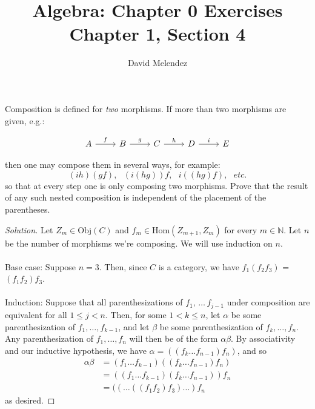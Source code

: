 \documentclass[12pt]{article}
\newenvironment{problem}[2][Problem]{\begin{trivlist}
\item[\hskip \labelsep {\bfseries #1}\hskip \labelsep {\bfseries #2.}]}{\end{trivlist}}
\newenvironment{solution}
  {\renewcommand\qedsymbol{$\blacksquare$}\begin{proof}[Solution]}
{\end{proof}}
\begin{document}
\title{Algebra: Chapter 0 Exercises\\ \large Chapter 1, Section 4}
\author{David Melendez}
\maketitle

\begin{problem}{4.1}
    Composition is defined for \textit{two} morphisms. 
    If more than two morphisms are given, e.g.:

    \[\begin{tikzcd}
        A \ar[r,"f"] & B \ar[r,"g"] & C \ar[r,"h"] & D \ar[r,"i"] & E
    \end{tikzcd}\]

    then one may compose them in several ways, for example:
    \begin{equation*}
        (ih)(gf),\,\,\,\, (i(hg))f,\,\,\,\, i((hg)f),\,\,\,\, etc.
    \end{equation*}
    so that at every step one is only composing two morphisms. 
    Prove that the result of any such nested composition is independent of the placement of the parentheses.
\end{problem}
\begin{solution}
  Let $Z_m \in \text{Obj}(C)$ and $f_m \in \text{Hom}{(Z_{m+1}, Z_{m})}$ for every $m \in \mathbb{N}$. 
  Let $n$ be the number of morphisms we're composing.
  We will use induction on $n$.
  \\\\Base case: Suppose $n=3$. 
  Then, since $C$ is a category, we have $f_1(f_2f_3)$ = $(f_1f_2)f_3$.
  \\\\Induction: Suppose that all parenthesizations of $f_1,\, \ldots\, f_{j-1}$ under composition are equivalent for all $1 \leq j < n$.
  Then, for some $1 < k \leq n$, let $\alpha$ be some parenthesization of $f_1, \ldots, f_{k-1}$, and let $\beta$ be some parenthesization of $f_k, \ldots, f_{n}$.
  Any parenthesization of $f_1, \ldots, f_n$ will then be of the form $\alpha\beta$.
  By associativity and our inductive hypothesis, we have $\alpha=\left( (f_k \ldots f_{n-1})f_n \right)$, and so
  \begin{align*}
    \alpha\beta &= (f_1\ldots f_{k-1})\left( (f_k\ldots f_{n-1})f_n \right) \\
    &= \left( (f_1 \ldots f_{k-1})(f_k \ldots f_{n-1}) \right)f_n \\
    &= ((\ldots((f_1f_2)f_3)\ldots)f_n
  \end{align*}
  as desired.
\end{solution}
\end{document}
